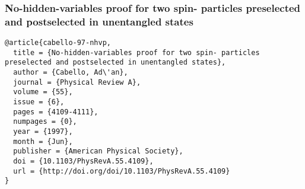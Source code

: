 \documentclass[%
  twocolumn,
 showpacs,
 showkeys,
 preprintnumbers,
 amsmath,amssymb,
 aps,
  pra,
  longbibliography,
 floatfix,
 ]{revtex4-1}
\begin{document}
\clearpage
\newpage

\subsubsection{No-hidden-variables proof for two spin- particles preselected and postselected in unentangled states}
\begin{verbatim}
@article{cabello-97-nhvp,
  title = {No-hidden-variables proof for two spin- particles preselected and postselected in unentangled states},
  author = {Cabello, Ad\'an},
  journal = {Physical Review A},
  volume = {55},
  issue = {6},
  pages = {4109-4111},
  numpages = {0},
  year = {1997},
  month = {Jun},
  publisher = {American Physical Society},
  doi = {10.1103/PhysRevA.55.4109},
  url = {http://doi.org/doi/10.1103/PhysRevA.55.4109}
}
\end{verbatim}
\end{document}
